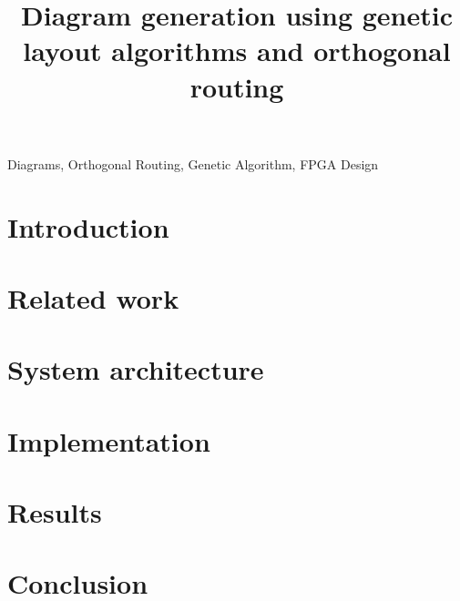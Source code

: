 \documentclass[conference]{IEEEtran}
\begin{document}
\title{Diagram generation using genetic layout algorithms and orthogonal routing}



\author{
}
\maketitle

\begin{abstract} 

\end{abstract}

\begin{IEEEkeywords}
Diagrams, Orthogonal Routing, Genetic Algorithm, FPGA Design 
\end{IEEEkeywords}

\section{Introduction}
\label{sec:introduction}


\section{Related work}
\label{sec:relatedwork}


\section{System architecture}
\label{sec:architecture}


\section{Implementation}
\label{sec:implementation}



\section{Results} 
\label{sec:results}


\section{Conclusion}
\label{sec:conclusion}




\end{document}
